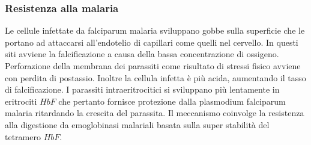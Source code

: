 \subsubsection{Resistenza alla malaria}
Le cellule infettate da falciparum malaria sviluppano gobbe sulla superficie che le portano ad attaccarsi all'endotelio di capillari come quelli nel cervello. In questi siti avviene
la falcificazione a causa della bassa concentrazione di ossigeno. Perforazione della membrana dei parassiti come risultato di stressi fisico avviene con perdita di postassio. Inoltre
la cellula infetta \`e pi\`u acida, aumentando il tasso di falcificazione. I parassiti intraeritrocitici si sviluppano pi\`u lentamente in eritrociti $HbF$ che pertanto fornisce
protezione dalla plasmodium falciparum malaria ritardando la crescita del parassita. Il meccanismo coinvolge la resistenza alla digestione da emoglobinasi malariali basata sulla 
super stabilit\`a del tetramero $HbF$. 
